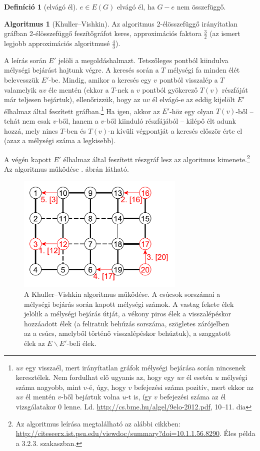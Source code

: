 \documentclass{article}
\theoremstyle{definition}
\newtheorem*{definicio}{Definíció}
\newtheorem*{algoritmus}{Algoritmus}
\begin{document}
\begin{definicio}[elvágó él]
$e \in E(G)$ elvágó él, ha $G-e$ nem összefüggő.
\end{definicio}

\begin{algoritmus}[Khuller--Vishkin]
Az algoritmus 2-élösszefüggő irányítatlan gráfban 2-élösszefüggő feszítőgráfot keres, approximációs faktora $\frac{3}{2}$ (az ismert legjobb approximációs algoritmusé $\frac{4}{3}$).

A leírás során $E'$ jelöli a megoldáshalmazt. Tetszőleges pontból kiindulva mélységi bejárást hajtunk végre. A keresés során a $T$ mélységi fa minden élét belevesszük $E'$-be. Mindig, amikor a keresés egy $v$ pontból visszalép a $T$ valamelyik $uv$ éle mentén (ekkor a $T$-nek a $v$ pontból gyökerező $T(v)$ részfáját már teljesen bejártuk), ellenőrizzük, hogy az $uv$ él elvágó-e az eddig kijelölt $E'$ élhalmaz által feszített gráfban.\footnote{$uv$ egy visszaél, mert irányítatlan gráfok mélységi bejárása során nincsenek keresztélek. Nem fordulhat elő ugyanis az, hogy egy $uv$ él esetén $u$ mélységi száma nagyobb, mint $v$-é, úgy, hogy $v$ befejezési száma pozitív, mert ekkor az $uv$ él mentén $v$-ből bejártuk volna $u$-t is, így $v$ befejezési száma az él vizsgálatakor 0 lenne. Ld. \url{http://cs.bme.hu/algel/9elo-2012.pdf}, 10--11. dia} Ha igen, akkor az $E'$-höz egy olyan $T(v)$-ből -- tehát nem csak $v$-ből, hanem a $v$-ből kiinduló részfájából -- kilépő élt adunk hozzá, mely nincs $T$-ben és $T(v)$-n kívüli végpontját a keresés először érte el (azaz a mélységi száma a legkisebb).

A végén kapott $E'$ élhalmaz által feszített részgráf lesz az algoritmus kimenete.\footnote{Az algoritmus leírása megtalálható az alábbi cikkben: \url{http://citeseerx.ist.psu.edu/viewdoc/summary?doi=10.1.1.56.8290}. Éles példa a 3.2.3. szakaszban.} Az algoritmus működése . ábrán látható.
\end{algoritmus}

\begin{figure}
\centering
\includegraphics[width=80mm,keepaspectratio]{figures/khuller_vishkin_pelda.pdf}
\caption{A Khuller--Vishkin algoritmus működése. A csúcsok sorszámai a mélységi bejárás során kapott mélységi számok. A vastag fekete élek jelölik a mélységi bejárás útját, a vékony piros élek a visszalépéskor hozzáadott élek (a feliratuk behúzás sorszáma, szögletes zárójelben az a csúcs, amelyből történő visszalépéskor behúztuk), a szaggatott élek az $E \backslash E'$-beli élek.}
\label{fig:khuller_vishkin_pelda}
\end{figure}
\end{document}
